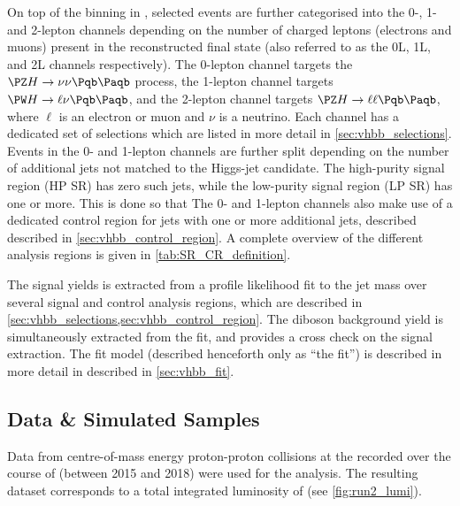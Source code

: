 On top of the binning in \ptv, selected events are further categorised into the 0-, 1- and 2-lepton channels depending on the number of charged leptons (electrons and muons) present in the reconstructed final state (also referred to as the 0L, 1L, and 2L channels respectively).
The 0-lepton channel targets the $\Zboson \higgs \rightarrow \nu\nu \bbbar$ process, the 1-lepton channel targets $\Wboson \higgs \rightarrow \ell\nu \bbbar$, and the 2-lepton channel targets $\Zboson \higgs \rightarrow \ell\ell \bbbar$, where $\ell$ is an electron or muon and $\nu$ is a neutrino.
Each channel has a dedicated set of selections which are listed in more detail in \cref{sec:vhbb_selections}.
Events in the 0- and 1-lepton channels are further split depending on the number of additional \smallR jets
not matched to the Higgs-jet candidate.
The high-purity signal region (HP SR) has zero such jets, while the low-purity signal region (LP SR) has one or more.
This is done so that  
The 0- and 1-lepton channels also make use of a dedicated \ttbar control region for jets with one or more additional \btagged \smallR jets, described described in \cref{sec:vhbb_control_region}.
A complete overview of the different analysis regions is given in \cref{tab:SR_CR_definition}.

%

%

The signal \VHbb yields is extracted from a profile likelihood fit to the \largeR jet mass over several signal and control analysis regions, which are described in \cref{sec:vhbb_selections,sec:vhbb_control_region}.
The diboson background \VZbb yield is simultaneously extracted from the fit, and provides a cross check on the signal extraction.
The fit model (described henceforth only as ``the fit'') is described in more detail in described in \cref{sec:vhbb_fit}.


\subsection{Data \& Simulated Samples}\label{sec:vhbb_samples}

Data from centre-of-mass energy  proton-proton collisions at the \LHC recorded over the course of \runtwo (between 2015 and
2018) were used for the analysis.
The resulting dataset corresponds to a total integrated luminosity of \intlumi (see \cref{fig:run2_lumi}).

